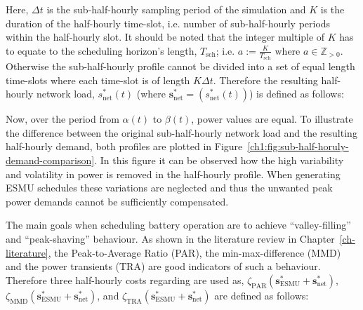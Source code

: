 


Here, $\Delta t$ is the sub-half-hourly sampling period of the simulation and $K$ is the duration of the half-hourly time-slot, i.e. number of sub-half-hourly periods within the half-hourly slot.
It should be noted that the integer multiple of $K$ has to equate to the scheduling horizon's length, $T_\text{sch}$; i.e. $a := \frac{K}{T_\text{sch}} \text{ where } a \in \mathbb{Z}_{>0}$.
Otherwise the sub-half-hourly profile cannot be divided into a set of equal length time-slots where each time-slot is of length $K\Delta t$.
Therefore the resulting half-hourly network load, $s^{*}_\text{net}(t)$ (where $\textbf{s}^*_\text{net} = (s^*_\text{net}(t))$) is defined as follows:



Now, over the period from $\alpha(t)$ to $\beta(t)$, power values are equal.
To illustrate the difference between the original sub-half-hourly network load and the resulting half-hourly demand, both profiles are plotted in Figure~\ref{ch1:fig:sub-half-horuly-demand-comparison}.
In this figure it can be observed how the high variability and volatility in power is removed in the half-hourly profile.
When generating ESMU schedules these variations are neglected and thus the unwanted peak power demands cannot be sufficiently compensated.



The main goals when scheduling battery operation are to achieve ``valley-filling'' and ``peak-shaving'' behaviour.
As shown in the literature review in Chapter~\ref{ch-literature}, the Peak-to-Average Ratio (PAR), the min-max-difference (MMD) and the power transients (TRA) are good indicators of such a behaviour.
Therefore three half-hourly costs regarding are used as, $\zeta_\text{PAR}(\textbf{s}^*_\text{ESMU} + \textbf{s}^*_\text{net})$, $\zeta_\text{MMD}(\textbf{s}^*_\text{ESMU} + \textbf{s}^*_\text{net})$, and $\zeta_\text{TRA}(\textbf{s}^*_\text{ESMU} + \textbf{s}^*_\text{net})$ are defined as follows:

